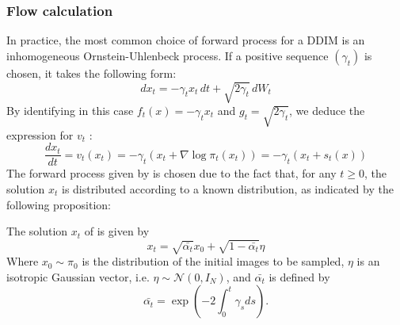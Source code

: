 \documentclass[a4paper,10pt]{article}
\begin{document}
\subsubsection{Flow calculation}\label{sec:calcul_numerique}
In practice, the most common choice of forward process for a DDIM is an inhomogeneous Ornstein-Uhlenbeck process. If a positive sequence $(\gamma_t)$  is chosen, it takes the following form:
\begin{equation}\label{eq:OU}
    dx_t = -\gamma_tx_t \,dt + \sqrt{2\gamma_t}\,dW_t
\end{equation}
By identifying in this case $f_t(x) = -\gamma_tx_t$ and $g_t = \sqrt{2\gamma_t}$, we deduce the expression for $v_t$ :
\begin{equation}\label{eq:backward}
    \frac{dx_t}{dt} = v_t(x_t) = -\gamma_t(x_t+\nabla \log \pi_t(x_t)) = -\gamma_t(x_t+s_t(x))
\end{equation}
The forward process given by  is chosen due to the fact that, for any $t \geq 0$, the solution $x_t$ is distributed according to a known distribution, as indicated by the following proposition:
\begin{proposition}\label{prop:solution_processus_direct}
    The solution $x_t$ of  is given by
    \begin{equation}\label{eq:solforphi}
        x_t = \sqrt{\bar{\alpha_t}}x_0 + \sqrt{1-\bar{\alpha_t}}\eta
    \end{equation}
    Where $x_0 \sim \pi_0$ is the distribution of the initial images to be sampled, $\eta$ is an isotropic Gaussian vector, i.e. $\eta \sim \mathcal{N}(0, I_N)$, and $\bar{\alpha_t}$ is defined by 
    \[\bar{\alpha_t} = \exp{\left(-2\int_0^t \gamma_s ds\right)}.\]    
\end{proposition}
\end{document}
